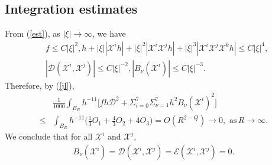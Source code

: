 \documentclass[reqno,12pt]{amsart}
\numberwithin{equation}{section}
\theoremstyle{plain}
\theoremstyle{definition}
\begin{document}
\subsection{Integration estimates}
From (\ref{est}), as $|\xi|\rightarrow\infty$, we have
\begin{align*}
    &f\leq C |\xi|^2,h +|\xi||\mathscr{X}^i h|+|\xi|^2|\mathscr{X}^i\mathscr{X}^j h|+|\xi|^3|\mathscr{X}^i\mathscr{X}^j\mathscr{X}^k h|   \leq C |\xi|^4,\\& |\mathcal{D}(\mathscr{X}^i,\mathscr{X}^j)|\leq C|\xi|^{-2},|B_\nu(\mathscr{X}^i)|\leq C|\xi|^{-3}.
\end{align*}
Therefore, by (\ref{jl}),
\begin{equation*}
\begin{aligned}
     &\frac{1}{1000}\int_{B_R}h^{-11}\bigg[fh\mathcal{D}^2+\Sigma_{i=0}^7\Sigma_{\nu=1}^7h^2B_\nu (\mathscr{X}^i)^2\bigg]     
     \\\leq& \int_{B_R} h^{-11}\bigg(\frac{1}{3} O_1+\frac{4}{3}O_2+4O_3\bigg)=O(R^{2-Q})\rightarrow 0, \,\,\textrm{as}\,R\rightarrow \infty.\end{aligned}
    \end{equation*}
We conclude that for all  $\mathscr{X}^i$ and $ \mathscr{X}^j$, 
\begin{align}\label{4.3}
    B_\nu (\mathscr{X}^i)=\mathcal{D}(\mathscr{X}^i,\mathscr{X}^j)=\mathcal{E}(\mathscr{X}^i,\mathscr{X}^j)=0.
\end{align}
\end{document}
